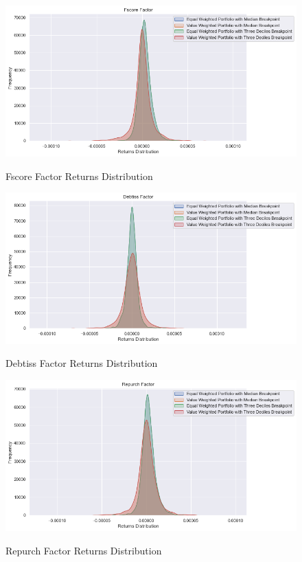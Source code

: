 \begin{figure}[H]
	\caption{Fscore Factor Returns Distribution}
	\centering
	\includegraphics[scale=.63]{../../output/figures/fscore.png}
	\label{fig:fscore}
\end{figure}

\begin{figure}[H]
	\caption{Debtiss Factor Returns Distribution}
	\centering
	\includegraphics[scale=.63]{../../output/figures/debtiss.png}
	\label{fig:debtiss}
\end{figure}

\begin{figure}[H]
	\caption{Repurch Factor Returns Distribution}
	\centering
	\includegraphics[scale=.63]{../../output/figures/repurch.png}
	\label{fig:repurch}
\end{figure}

